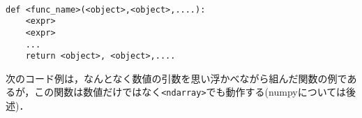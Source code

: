 \begin{gram}[関数の定義]　
\begin{lstlisting}
def <func_name>(<object>,<object>,....):
	<expr>
	<expr>
	...
	return <object>, <object>,....
\end{lstlisting}
\end{gram}

次のコード例は，なんとなく数値の引数を思い浮かべながら組んだ関数の例であるが，この関数は数値だけではなく\texttt{<ndarray>}でも動作する(numpyについては後述)．
\begin{cod}[\texttt{py5.py}]　
}]{code/py5.py}
\vspace{-7pt}
\begin{lstlisting}
add=9,sub=11,mul=-10,div=-10.0
tpl=(0, 10, -25, -1.0)

add=[0 0 0],sub=[2 4 6],mul=[-1 -4 -9],div=[-1. -1. -1.]
\end{lstlisting}
\end{cod}
\vspace{-10pt}

















